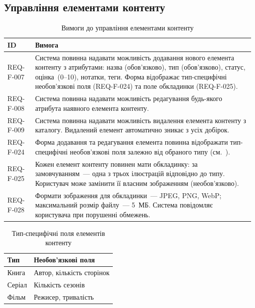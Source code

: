 \subsection{Управління елементами контенту}

\begin{table}[h]
\caption{Вимоги до управління елементами контенту}
\label{tab:content}
\begin{tabular}{L{2.5cm} L{11.5cm}}
\toprule
\textbf{ID} & \textbf{Вимога} \\
\midrule
REQ-F-007 & Система повинна надавати можливість додавання нового елемента контенту з атрибутами: назва (обов'язково), тип (обов'язково), статус, оцінка~(0–10), нотатки, теги. Форма відображає тип-специфічні необов'язкові поля (REQ-F-024) та поле обкладинки (REQ-F-025).  \\
\addlinespace
REQ-F-008 & Система повинна надавати можливість редагування будь-якого атрибута наявного елемента контенту.  \\
\addlinespace
REQ-F-009 & Система повинна надавати можливість видалення елемента контенту з каталогу. Видалений елемент автоматично зникає з усіх добірок.  \\
\addlinespace
REQ-F-024 & Форма додавання та редагування елемента повинна відображати тип-специфічні необов'язкові поля залежно від обраного типу (см.~).  \\
\addlinespace
REQ-F-025 & Кожен елемент контенту повинен мати обкладинку: за замовчуванням~--- одна з трьох ілюстрацій відповідно до типу. Користувач може замінити її власним зображенням (необов'язково).  \\
\addlinespace
REQ-F-028 & Формати зображення для обкладинки~--- JPEG, PNG, WebP; максимальний розмір файлу~--- 5~МБ. Система повідомляє користувача при порушенні обмежень.  \\
\bottomrule
\end{tabular}
\end{table}

\begin{table}[h]
\caption{Тип-специфічні поля елементів контенту}
\label{tab:type-fields}
\begin{tabular}{L{3cm} L{11cm}}
\toprule
\textbf{Тип} & \textbf{Необов'язкові поля} \\
\midrule
Книга & Автор, кількість сторінок \\
Серіал & Кількість сезонів \\
Фільм & Режисер, тривалість \\
\bottomrule
\end{tabular}
\end{table}

